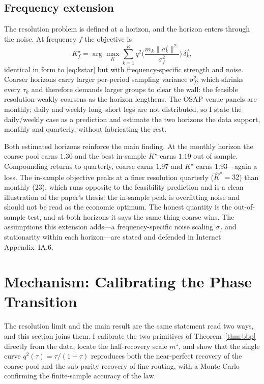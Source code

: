 \documentclass[12pt]{article}
\theoremstyle{plain}
\theoremstyle{definition}
\begin{document}
\subsection{Frequency extension}
\label{sec:kstar-freq}

The resolution problem is defined at a horizon, and the horizon enters through
the noise. At frequency $f$ the objective is
\[
K_f^\star=\arg\max_K\sum_{k=1}^{K}
q^2\!\Big(\frac{m_k\lVert\bar a_k^f\rVert^2}{\sigma_f^2}\Big)\,\delta_k^f,
\]
identical in form to \eqref{eq:kstar} but with frequency-specific strength and
noise. Coarser horizons carry larger per-period sampling variance $\sigma_f^2$,
which shrinks every $\tau_k$ and therefore demands larger groups to clear the
wall: the feasible resolution weakly coarsens as the horizon lengthens. The OSAP
venue panels are monthly; daily and weekly long--short legs are not distributed,
so I state the daily/weekly case as a prediction and estimate the two horizons the
data support, monthly and quarterly, without fabricating the rest.

Both estimated horizons reinforce the main finding. At the monthly horizon the
coarse pool earns $1.30$ and the best in-sample $K^\star$ earns $1.19$ out of
sample. Compounding returns to quarterly, coarse earns $1.97$ and $K^\star$ earns
$1.93$---again a loss. The in-sample objective peaks at a finer resolution
quarterly ($\hat K^\star=32$) than monthly ($23$), which runs opposite to the
feasibility prediction and is a clean illustration of the paper's thesis: the
in-sample peak is overfitting noise and should not be read as the economic
optimum. The honest quantity is the out-of-sample test, and at both horizons it
says the same thing coarse wins. The assumptions this extension adds---a
frequency-specific noise scaling $\sigma_f$ and stationarity within each
horizon---are stated and defended in Internet Appendix~IA.6.

\section{Mechanism: Calibrating the Phase Transition}
\label{sec:mech}

The resolution limit and the main result are the same statement read two ways,
and this section joins them. I calibrate the two primitives of Theorem~\ref{thm:bbp}
directly from the data, locate the half-recovery scale $m^\star$, and show that
the single curve $q^2(\tau)=\tau/(1+\tau)$ reproduces both the near-perfect
recovery of the coarse pool and the sub-parity recovery of fine routing, with a
Monte Carlo confirming the finite-sample accuracy of the law.
\end{document}
